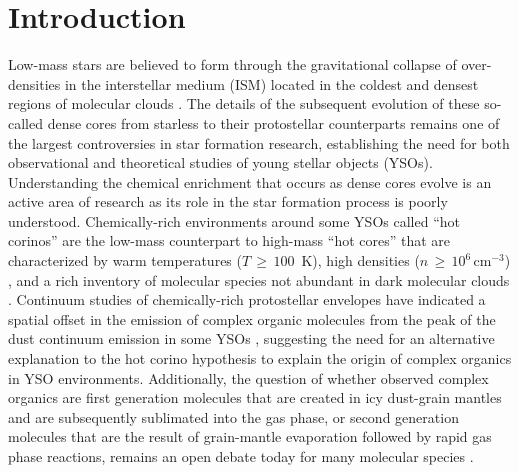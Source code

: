\documentclass[iop,twocolappendix]{emulateapj}
\begin{document}
\maketitle

\section{Introduction}
\label{sec:introduction}

Low-mass stars are believed to form through the gravitational collapse of over-densities in the interstellar medium (ISM) located in the coldest and densest regions of molecular clouds \citep[e.g.,][]{Myers1985}. The details of the subsequent evolution of these so-called dense cores from starless to their protostellar counterparts remains one of the largest controversies in star formation research, establishing the need for both observational and theoretical studies of young stellar objects (YSOs). Understanding the chemical enrichment that occurs as dense cores evolve is an active area of research as its role in the star formation process is poorly understood. Chemically-rich environments around some YSOs called ``hot corinos'' are the low-mass counterpart to high-mass ``hot cores'' that are characterized by warm temperatures ($T\,{\geq}\,100$~K), high densities ($n\,{\geq}\,10^{6}$\,cm$^{-3}$) \citep{Cazaux2003}, and a rich inventory of molecular species not abundant in dark molecular clouds \citep{Walmsley1992}. Continuum studies of chemically-rich protostellar envelopes have indicated a spatial offset in the emission of complex organic molecules from the peak of the dust continuum emission in some YSOs \citep[e.g.,][]{Chandler2005}, suggesting the need for an alternative explanation to the hot corino hypothesis to explain the origin of complex organics in YSO environments. Additionally, the question of whether observed complex organics are first generation molecules that are created in icy dust-grain mantles and are subsequently sublimated into the gas phase, or second generation molecules that are the result of grain-mantle evaporation followed by rapid gas phase reactions, remains an open debate today for many molecular species \citep{Bisschop2008}. 
\end{document}
